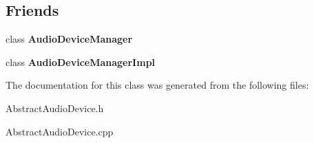 \subsection*{Friends}
\begin{DoxyCompactItemize}
\item 
\hypertarget{class_audio_d_x_1_1_abstract_audio_device_aa3d09594a601dd4ef0a0bdd1c6ddd73c}{class {\bfseries Audio\-Device\-Manager}}\label{class_audio_d_x_1_1_abstract_audio_device_aa3d09594a601dd4ef0a0bdd1c6ddd73c}

\item 
\hypertarget{class_audio_d_x_1_1_abstract_audio_device_a04f96566766f09f439a3a13c5fcbe408}{class {\bfseries Audio\-Device\-Manager\-Impl}}\label{class_audio_d_x_1_1_abstract_audio_device_a04f96566766f09f439a3a13c5fcbe408}

\end{DoxyCompactItemize}


The documentation for this class was generated from the following files\-:\begin{DoxyCompactItemize}
\item 
Abstract\-Audio\-Device.\-h\item 
Abstract\-Audio\-Device.\-cpp\end{DoxyCompactItemize}
